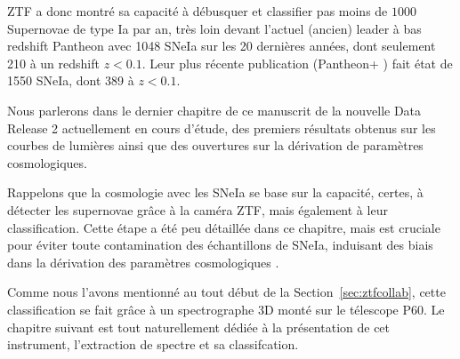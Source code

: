 \documentclass[../main/main.tex]{subfiles}
\begin{document}
ZTF a donc montré sa capacité à débusquer et classifier pas moins de
$1000$ Supernovae de type Ia par an, très loin devant l'actuel (ancien)
leader à bas redshift Pantheon \citep{Scolnicpantheon18} avec 1048 SNeIa
sur les 20 dernières années, dont seulement 210 à un redshift
$z<0.1$. Leur plus récente publication (Pantheon+
\citet{Scolnicpantheon21}) fait état de 1550 SNeIa, dont 389 à $z<0.1$.

Nous parlerons dans le dernier chapitre de ce manuscrit de la nouvelle
Data Release 2 actuellement en cours d'étude, des premiers résultats obtenus sur les courbes de
lumières ainsi que des ouvertures sur la dérivation de paramètres
cosmologiques.

Rappelons que la cosmologie avec les SNeIa se base sur la capacité, certes, à
détecter les supernovae grâce à la caméra ZTF, mais également à leur
classification. Cette étape a été peu détaillée dans ce chapitre, mais
est cruciale pour éviter toute contamination des échantillons de SNeIa,
induisant des biais dans la dérivation des paramètres cosmologiques
\citep{JonesScolnic17SNcontam}.

Comme nous l'avons mentionné au tout
début de la Section~\ref{sec:ztfcollab}, cette classification se fait
grâce à un spectrographe 3D monté sur le télescope P60. Le chapitre
suivant est tout naturellement dédiée à la présentation de cet
instrument, l'extraction de spectre et sa classifcation.




\end{document}
